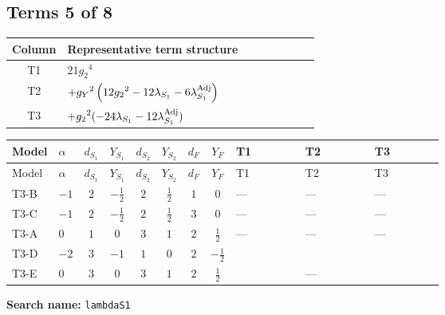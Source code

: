 \documentclass[8pt]{article}
\begin{document}
\begin{landscape}
\subsection*{Terms 5 of 8}
\begin{center}
\begin{tabular}{@{}c >{\raggedright\arraybackslash}p{0.82\linewidth}@{}}
\toprule
Column & Representative term structure \\
\midrule
T1 & \(\displaystyle 21 {g_2}^4\) \\
\midrule
T2 & \(\displaystyle +{g_Y}^2 \left(12 {g_2}^2-12 {\lambda_{S_1}}-6 {\lambda_{S_1}^{\rm Adj}}\right)\) \\
\midrule
T3 & \(\displaystyle +{g_2}^2 (-24 {\lambda_{S_1}}-12 {\lambda_{S_1}^{\rm Adj}})\) \\
\midrule
\bottomrule
\end{tabular}
\end{center}
\smallskip
\tiny
\begin{longtable}{@{}llcccccc >{\raggedright\arraybackslash}p{0.21\linewidth} >{\raggedright\arraybackslash}p{0.21\linewidth} >{\raggedright\arraybackslash}p{0.21\linewidth}@{}}
\toprule
Model & $\alpha$ & $d_{S_1}$ & $Y_{S_1}$ & $d_{S_2}$ & $Y_{S_2}$ & $d_F$ & $Y_F$ & T1 & T2 & T3 \\
\midrule
\endfirsthead
\toprule
Model & $\alpha$ & $d_{S_1}$ & $Y_{S_1}$ & $d_{S_2}$ & $Y_{S_2}$ & $d_F$ & $Y_F$ & T1 & T2 & T3 \\
\midrule
\endhead
T3-B & $-1$ & $2$ & $-\frac{1}{2}$ & $2$ & $\frac{1}{2}$ & $1$ & $0$ & --- & --- & --- \\
\midrule
T3-C & $-1$ & $2$ & $-\frac{1}{2}$ & $2$ & $\frac{1}{2}$ & $3$ & $0$ & --- & --- & --- \\
\midrule
T3-A & $0$ & $1$ & $0$ & $3$ & $1$ & $2$ & $\frac{1}{2}$ & --- & --- & --- \\
\midrule
T3-D & $-2$ & $3$ & $-1$ & $1$ & $0$ & $2$ & $-\frac{1}{2}$ & \scriptsize\adjustbox{max width=\linewidth}{$\begin{gathered} 21 {g_2}^4\end{gathered}$} & \scriptsize\adjustbox{max width=\linewidth}{$\begin{gathered} +{g_Y}^2 \left(12 {g_2}^2-12 {\lambda_{S_1}}-6 {\lambda_{S_1}^{\rm Adj}}\right)\end{gathered}$} & \scriptsize\adjustbox{max width=\linewidth}{$\begin{gathered} +{g_2}^2 (-24 {\lambda_{S_1}}-12 {\lambda_{S_1}^{\rm Adj}})\end{gathered}$} \\
\midrule
T3-E & $0$ & $3$ & $0$ & $3$ & $1$ & $2$ & $\frac{1}{2}$ & \scriptsize\adjustbox{max width=\linewidth}{$\begin{gathered} 21 {g_2}^4\end{gathered}$} & --- & \scriptsize\adjustbox{max width=\linewidth}{$\begin{gathered} +{g_2}^2 (-24 {\lambda_{S_1}}-12 {\lambda_{S_1}^{\rm Adj}})\end{gathered}$} \\
\midrule
\bottomrule
\end{longtable}
\clearpage
\noindent\textbf{Search name: }\texttt{lambdaS1}\par\smallskip

\end{landscape}
\end{document}
